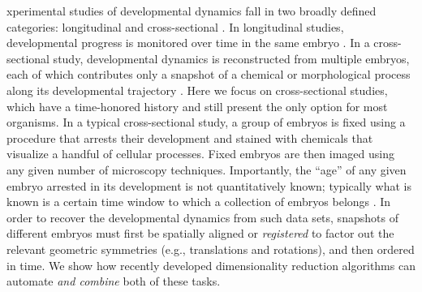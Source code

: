 \documentclass{pnastwo}
\begin{document}
\begin{article}




xperimental studies of developmental dynamics fall in two broadly defined categories: longitudinal and cross-sectional \cite{diggle2002analysis}.
%
In longitudinal studies, developmental progress is monitored over time in the same embryo \cite{roelens2013live, keller2013imaging}.
%
In a cross-sectional study, developmental dynamics is reconstructed from multiple embryos, each of which contributes only a snapshot of a chemical or morphological process along its developmental trajectory \cite{jaeger2004dynamic, fowlkes2008quantitative}.
%
Here we focus on cross-sectional studies, which have a time-honored history and still present the only option for most organisms.
%
In a typical cross-sectional study, a group of embryos is fixed using a procedure that arrests their development and stained with chemicals that visualize a handful of cellular processes.
%
Fixed embryos are then imaged using any given number of microscopy techniques.
%
%
Importantly, the ``age'' of any given embryo arrested in its development is not quantitatively known; typically what is known is
a certain time window to which a collection of embryos belongs \cite{ng2012large, richardson2014emage, castro2009automatic}.
%
In order to recover the developmental dynamics from such data sets, snapshots of different embryos must first be spatially aligned or {\em registered} to factor out the relevant geometric symmetries (e.g., translations and rotations), and then ordered in time.
%
We show how recently developed dimensionality reduction algorithms can automate {\it and combine} both of these tasks.


\end{article}
\end{document}
